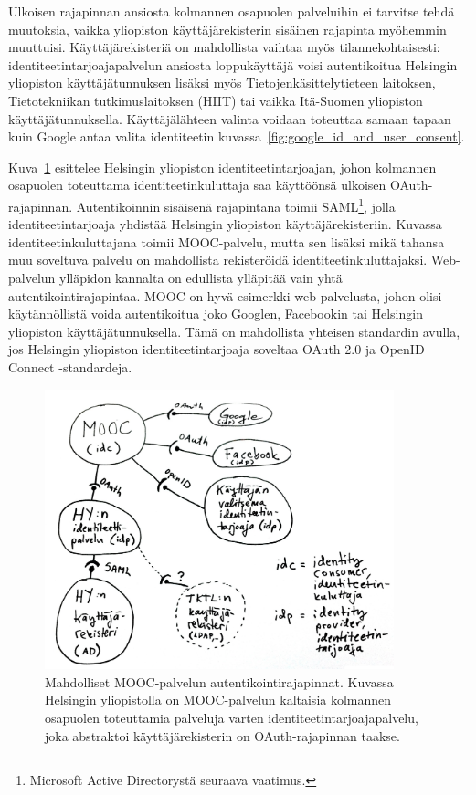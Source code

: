 \documentclass[finnish,gradu]{tktltiki}
\begin{document}
  Ulkoisen rajapinnan ansiosta kolmannen osapuolen palveluihin ei tarvitse tehdä muutoksia, vaikka yliopiston käyttäjärekisterin sisäinen rajapinta myöhemmin muuttuisi. Käyttäjärekisteriä on mahdollista vaihtaa myös tilannekohtaisesti: identiteetintarjoajapalvelun ansiosta loppukäyttäjä voisi autentikoitua Helsingin yliopiston käyttäjätunnuksen lisäksi myös Tietojenkäsittelytieteen laitoksen, Tietotekniikan tutkimuslaitoksen (HIIT) tai vaikka Itä-Suomen yliopiston käyttäjätunnuksella. Käyttäjälähteen valinta voidaan toteuttaa samaan tapaan kuin Google antaa valita identiteetin kuvassa~\ref{fig:google_id_and_user_consent}.

  Kuva~\ref{fig:mooc_hy_idp} esittelee Helsingin yliopiston identiteetintarjoajan, johon kolmannen osapuolen toteuttama identiteetinkuluttaja saa käyttöönsä ulkoisen OAuth-rajapinnan. Autentikoinnin sisäisenä rajapintana toimii SAML\footnote{Microsoft Active Directorystä seuraava vaatimus.}, jolla identiteetintarjoaja yhdistää Helsingin yliopiston käyttäjärekisteriin. Kuvassa identiteetinkuluttajana toimii MOOC-palvelu, mutta sen lisäksi mikä tahansa muu soveltuva palvelu on mahdollista rekisteröidä identiteetinkuluttajaksi. Web-palvelun ylläpidon kannalta on edullista ylläpitää vain yhtä autentikointirajapintaa. MOOC on hyvä esimerkki web-palvelusta, johon olisi käytännöllistä voida autentikoitua joko Googlen, Facebookin tai Helsingin yliopiston käyttäjätunnuksella. Tämä on mahdollista yhteisen standardin avulla, jos Helsingin yliopiston identiteetintarjoaja soveltaa OAuth 2.0 ja OpenID Connect -standardeja.

  \begin{figure}[h!]
    \centering
    \includegraphics[width=0.9\textwidth]{images/mooc_hy_idp.jpg}
    \caption[Mahdolliset MOOC-palvelun autentikointirajapinnat.]{Mahdolliset MOOC-palvelun autentikointirajapinnat. Kuvassa Helsingin yliopistolla on MOOC-palvelun kaltaisia kolmannen osapuolen toteuttamia palveluja varten identiteetintarjoajapalvelu, joka abstraktoi käyttäjärekisterin on OAuth-rajapinnan taakse.}
    \label{fig:mooc_hy_idp}
  \end{figure}
\end{document}
